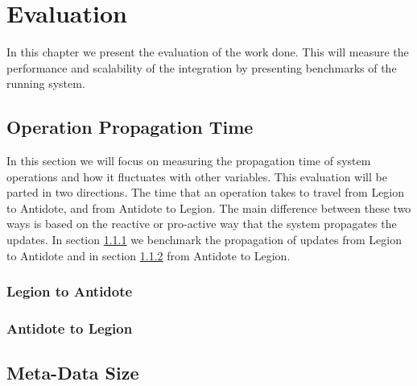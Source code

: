 \chapter{Evaluation}
\label{cha:evaluation}
In this chapter we present the evaluation of the work done. This will measure the performance and scalability of the integration by presenting benchmarks of the running system.

\section{Operation Propagation Time}
\label{sec:operation_propagation_time}
In this section we will focus on measuring the propagation time of system operations and how it fluctuates with other variables. This evaluation will be parted in two directions. The time that an operation takes to travel from Legion to Antidote, and from Antidote to Legion. The main difference between these two ways is based on the reactive or pro-active way that the system propagates the updates. In section \ref{sec:legion_to_antidote_evaluation} we benchmark  the propagation of updates from Legion to Antidote and in section \ref{sec:antidote_to_legion_evaluation} from Antidote to Legion.

\subsection{Legion to Antidote}
\label{sec:legion_to_antidote_evaluation}

\subsection{Antidote to Legion}
\label{sec:antidote_to_legion_evaluation}

\section{Meta-Data Size}
\label{sec:meta-data_size}